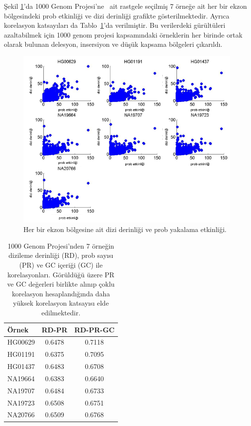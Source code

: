 \documentclass[11pt]{article}
\begin{document}
Şekil \ref{fig:captureeff}'da 1000 Genom Projesi'ne~\cite{1000GP2012} ait rastgele seçilmiş 7 örneğe ait her bir ekzon bölgesindeki prob etkinliği ve dizi derinliği grafikte gösterilmektedir. Ayrıca korelasyon katsayıları da Tablo~\ref{tab:correlation}'da verilmiştir. Bu verilerdeki gürültüleri azaltabilmek için 1000 genom projesi kapsamındaki örneklerin her birinde ortak olarak bulunan delesyon, insersiyon ve düşük kapsama bölgeleri çıkarıldı. 

\begin{figure}[htb]
\begin{center}
  \includegraphics[scale=0.65]{captureeff.png}
\end{center}
\caption{Her bir ekzon bölgesine ait dizi derinliği ve prob yakalama etkinliği.}
\label{fig:captureeff}
\end{figure}

\begin{table}[htb]
\begin{center}
\begin{tabular}{|l|c|c|}
\hline 
{\bf Örnek } & {\bf RD-PR} & {\bf RD-PR-GC}\\
\hline 
HG00629 & 0.6478 & 0.7118\\
HG01191 & 0.6375 & 0.7095\\
HG01437 & 0.6483 & 0.6708\\
NA19664 & 0.6383 & 0.6640\\
NA19707 & 0.6484 & 0.6733\\
NA19723 & 0.6508 & 0.6751\\
NA20766 & 0.6509 & 0.6768\\
\hline
\end{tabular}
\end{center}
\caption{1000 Genom Projesi'nden 7 örneğin dizileme derinliği (RD), prob sayısı (PR) ve GC içeriği (GC) ile korelasyonları. Görüldüğü üzere PR ve GC değerleri birlikte alınıp çoklu korelasyon hesaplandığında daha yüksek korelasyon katsayısı elde edilmektedir.}
\label{tab:correlation}
\end{table}
\end{document}

